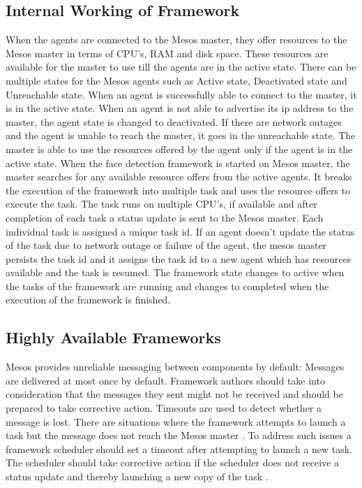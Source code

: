 \documentclass[9pt,twocolumn,twoside]{../../styles/osajnl}
\begin{document}
\subsection{Internal Working of Framework}
When the agents are connected to the Mesos master, they offer
resources to the Mesos master in terms of CPU's, RAM and disk
space. These resources are available for the master to use till the
agents are in the active state. There can be multiple states for the
Mesos agents such as Active state, Deactivated state and Unreachable
state. When an agent is successfully able to connect to the master, it
is in the active state. When an agent is not able to advertise its ip
address to the master, the agent state is changed to deactivated. If
there are network outages and the agent is unable to reach the master,
it goes in the unreachable state. The master is able to use the
resources offered by the agent only if the agent is in the active
state. When the face detection framework is started on Mesos master,
the master searches for any available resource offers from the active
agents. It breaks the execution of the framework into multiple task
and uses the resource offers to execute the task. The task runs on
multiple CPU's, if available and after completion of each task a
status update is sent to the Mesos master. Each individual task is
assigned a unique task id. If an agent doesn't update the status of
the task due to network outage or failure of the agent, the mesos
master persists the task id and it assigns the task id to a new agent
which has resources available and the task is resumed. The framework
state changes to active when the tasks of the framework are running
and changes to completed when the execution of the framework is
finished.

\subsection{Highly Available Frameworks}
Mesos provides unreliable messaging between components by default:
Messages are delivered at most once by default. Framework authors
should take into consideration that the messages they sent might not
be received and should be prepared to take corrective action. Timeouts
are used to detect whether a message is lost. There are situations
where the framework attempts to launch a task but the message does not
reach the Mesos master \cite{www-mesos-frmwrk}. To address such issues
a framework scheduler should set a timeout after attempting to launch
a new task. The scheduler should take corrective action if the
scheduler does not receive a status update and thereby launching a new
copy of the task \cite{www-mesos-arch}.
\end{document}
